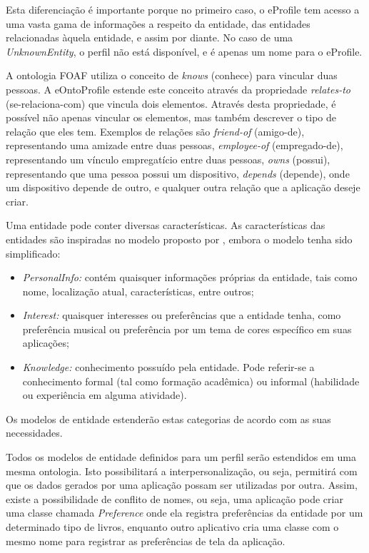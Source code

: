 Esta diferenciação é importante porque no primeiro caso, o eProfile tem acesso a uma vasta gama de informações a respeito da entidade, das entidades relacionadas àquela entidade, e assim por diante. No caso de uma {\em UnknownEntity}, o perfil não está disponível, e é apenas um nome para o eProfile.

A ontologia FOAF \cite{foaf} utiliza o conceito de {\em knows} (conhece) para vincular duas pessoas. A eOntoProfile estende este conceito através da propriedade {\em relates-to} (se-relaciona-com) que vincula dois elementos. Através desta propriedade, é possível não apenas vincular os elementos, mas também descrever o tipo de relação que eles tem. Exemplos de relações são {\em friend-of} (amigo-de), representando uma amizade entre duas pessoas, {\em employee-of} (empregado-de), representando um vínculo empregatício entre duas pessoas, {\em owns} (possui), representando que uma pessoa possui um dispositivo, {\em depends} (depende), onde um dispositivo depende de outro, e qualquer outra relação que a aplicação deseje criar.

Uma entidade pode conter diversas características. As características das entidades são inspiradas no modelo proposto por , embora o modelo tenha sido simplificado:
 
\begin{itemize}

  \item {\em PersonalInfo:} contém quaisquer informações próprias da entidade, tais como nome, localização atual, características, entre outros;

  \item {\em Interest:} quaisquer interesses ou preferências que a entidade tenha, como preferência musical ou preferência por um tema de cores específico em suas aplicações;

  \item {\em Knowledge:} conhecimento possuído pela entidade. Pode referir-se a conhecimento formal (tal como formação acadêmica) ou informal (habilidade ou experiência em alguma atividade).

\end{itemize}

Os modelos de entidade estenderão estas categorias de acordo com as suas necessidades.

Todos os modelos de entidade definidos para um perfil serão estendidos em uma mesma ontologia. Isto possibilitará a interpersonalização, ou seja, permitirá com que os dados gerados por uma aplicação possam ser utilizadas por outra. Assim, existe a possibilidade de conflito de nomes, ou seja, uma aplicação pode criar uma classe chamada {\em Preference} onde ela registra preferências da entidade por um determinado tipo de livros, enquanto outro aplicativo cria uma classe com o mesmo nome para registrar as preferências de tela da aplicação.

